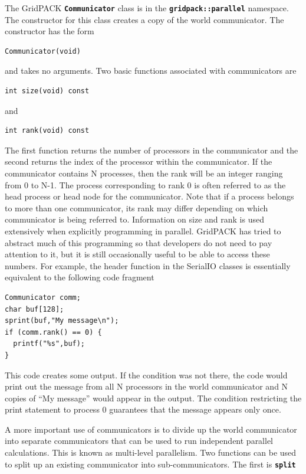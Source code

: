 \documentclass[12pt]{report} %
\begin{document}
The GridPACK \texttt{\textbf{Communicator}} class is in the \texttt{\textbf{gridpack::parallel}} namespace. The constructor for this class creates a copy of the world communicator. The constructor has the form

{
\color{red}
\begin{Verbatim}[fontseries=b]
Communicator(void)
\end{Verbatim}
}

and takes no arguments. Two basic functions associated with communicators are

{
\color{red}
\begin{Verbatim}[fontseries=b]
int size(void) const
\end{Verbatim}
}

and

{
\color{red}
\begin{Verbatim}[fontseries=b]
int rank(void) const
\end{Verbatim}
}

The first function returns the number of processors in the communicator and the second returns the index of the processor within the communicator. If the communicator contains N processes, then the rank will be an integer ranging from 0 to N-1. The process corresponding to rank 0 is often referred to as the head process or head node for the communicator. Note that if a process belongs to more than one communicator, its rank may differ depending on which communicator is being referred to. Information on size and rank is used extensively when explicitly programming in parallel. GridPACK has tried to abstract much of this programming so that developers do not need to pay attention to it, but it is still occasionally useful to be able to access these numbers. For example, the header function in the SerialIO classes is essentially equivalent to the following code fragment

{
\color{red}
\begin{Verbatim}[fontseries=b]
Communicator comm;
char buf[128];
sprint(buf,"My message\n");
if (comm.rank() == 0) {
  printf("%s",buf);
}
\end{Verbatim}
}

This code creates some output. If the condition was not there, the code would print out the message from all N processors in the world communicator and N copies of ``My message'' would appear in the output. The condition restricting the print statement to process 0 guarantees that the message appears only once.

A more important use of communicators is to divide up the world communicator into separate communicators that can be used to run independent parallel calculations. This is known as multi-level parallelism. Two functions can be used to split up an existing communicator into sub-communicators. The first is \texttt{\textbf{split}}
\end{document}
